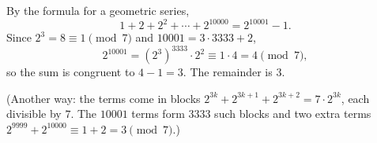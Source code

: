 By the formula for a geometric series,
\[1+2+2^2+\cdots+2^{10000}=2^{10001}-1 .\]
Since $2^3=8\equiv1\pmod7$ and $10001=3\cdot3333+2$,
\[2^{10001}=\left(2^3\right)^{3333}\cdot2^2\equiv1\cdot4=4\pmod 7,\]
so the sum is congruent to $4-1=3$. The remainder is $\boxed{3}$.

(Another way: the terms come in blocks $2^{3k}+2^{3k+1}+2^{3k+2}=7\cdot2^{3k}$, each divisible by $7$. The $10001$ terms form $3333$ such blocks and two extra terms $2^{9999}+2^{10000}\equiv1+2=3\pmod7$.)
